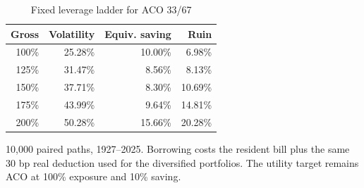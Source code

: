 \begin{table}[H]
\centering\small
\caption{Fixed leverage ladder for ACO 33/67}\label{tab:aco-ladder}
\begin{tabular}{rrrr}\toprule
Gross & Volatility & Equiv. saving & Ruin \\
\midrule
100\% & 25.28\% & 10.00\% & 6.98\% \\
125\% & 31.47\% & 8.56\% & 8.13\% \\
150\% & 37.71\% & 8.30\% & 10.69\% \\
175\% & 43.99\% & 9.64\% & 14.81\% \\
200\% & 50.28\% & 15.66\% & 20.28\% \\
\bottomrule\end{tabular}
\par\smallskip\begin{minipage}{0.96\textwidth}\footnotesize
10,000 paired paths, 1927--2025. Borrowing costs the resident bill plus the same 30 bp real deduction used for the diversified portfolios. The utility target remains ACO at 100\% exposure and 10\% saving.
\end{minipage}\end{table}
